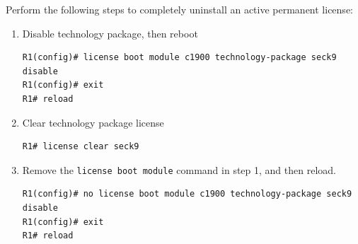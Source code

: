 Perform the following steps to completely uninstall an active permanent license:

\begin{enumerate}
\item Disable technology package, then reboot

\begin{verbatim}
R1(config)# license boot module c1900 technology-package seck9 disable
R1(config)# exit
R1# reload
\end{verbatim}

\item Clear technology package license

\begin{verbatim}
R1# license clear seck9
\end{verbatim}

\item Remove the \verb|license boot module| command in step 1, and then reload.

\begin{verbatim}
R1(config)# no license boot module c1900 technology-package seck9 disable
R1(config)# exit
R1# reload
\end{verbatim}

\end{enumerate}